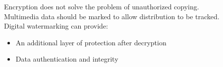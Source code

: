 \documentclass[10pt,a4paper]{book}
\begin{document}

Encryption does not solve the problem of unauthorized copying.\\
Multimedia data should be marked to allow distribution to be tracked.\\

Digital watermarking can provide: 
\begin{itemize}
\item An additional layer of protection after decryption 
\item  Data authentication and integrity
\end{itemize}
\end{document}
